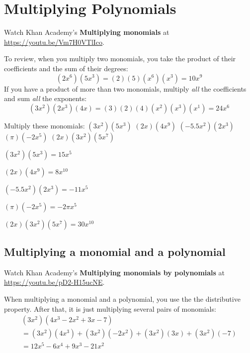 \chapter{Multiplying Polynomials}

Watch Khan Academy's \textbf{Multiplying monomials} at \url{https://youtu.be/Vm7H0VTlIco}.

To review, when you multiply two monomials, you take the product of
their coefficients and the sum of their degrees:
\begin{equation*}
  (2x^6)(5x^3) = (2)(5)(x^6)(x^3) = 10x^9
\end{equation*}
If you have a product of more than two monomials, multiply \emph{all}
the coefficients and sum \emph{all} the exponents:
\begin{equation*}
  (3x^2)(2x^3)(4x) = (3)(2)(4)(x^2)(x^3)(x^1) = 24x^6
\end{equation*}

\begin{Exercise}[title={Multiplying monomials}, label=multmonomials]
Multiply these monomials:
  \Question $(3x^2)(5x^3)$
\vspace{20mm}
  \Question $(2x)(4x^9)$
\vspace{20mm}
  \Question $(-5.5x^2)(2x^3)$
\vspace{20mm}
  \Question $(\pi)(-2x^5)$
\vspace{20mm}
  \Question $(2x)(3x^2)(5x^7)$
\vspace{20mm}
\end{Exercise}
\begin{Answer}[ref=multmonomials]
  $(3x^2)(5x^3) = 15x^5$
  
  $(2x)(4x^9) = 8x^{10}$
  
  $(-5.5x^2)(2x^3) = -11x^5$

  $(\pi)(-2x^5) = -2\pi x^5$
  
  $(2x)(3x^2)(5x^7) = 30x^{10}$
\end{Answer}

\section{Multiplying a monomial and a polynomial}

Watch Khan Academy's \textbf{Multiplying monomials by polynomials} at \url{https://youtu.be/pD2-H15ucNE}.

When multiplying a monomial and a polynomial, you use the the distributive property. After that, it is just multiplying several pairs of monomials:
\begin{multline*}
  (3x^2)(4x^3 - 2x^2 + 3x - 7) \\
  = (3x^2)(4x^3) + (3x^2)(-2x^2) + (3x^2)(3x) + (3x^2)(-7) \\
  = 12x^5 - 6x^4 + 9x^3 -21x^2
\end{multline*}

